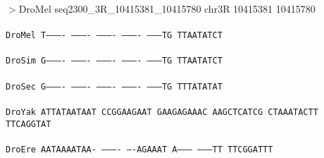\documentclass[11pt,twoside,reqno,a4paper]{article}
\begin{document}
\noindent
\newlength{\charwidth}$>$DroMel	seq2300\_3R\_10415381\_10415780	chr3R	10415381	10415780 \\
 \\
\texttt{DroMel	T----------	----------	----------	----------	--------TG	TTAATATCT\\
\hspace*{7\charwidth}\hspace*{1\charwidth}\hspace*{1\charwidth}\hspace*{1\charwidth}\hspace*{1\charwidth}\hspace*{1\charwidth}\\
DroSim	G----------	----------	----------	----------	--------TG	TTAATATCT\\
\hspace*{7\charwidth}\hspace*{1\charwidth}\hspace*{1\charwidth}\hspace*{1\charwidth}\hspace*{1\charwidth}\hspace*{1\charwidth}\\
DroSec	G----------	----------	----------	----------	--------TG	TTTATATAT\\
\hspace*{7\charwidth}\hspace*{1\charwidth}\hspace*{1\charwidth}\hspace*{1\charwidth}\hspace*{1\charwidth}\hspace*{1\charwidth}\\
DroYak	ATTATAATAAT	CCGGAAGAAT	GAAGAGAAAC	AAGCTCATCG	CTAAATACTT	TTCAGGTAT\\
\hspace*{7\charwidth}\hspace*{1\charwidth}\hspace*{1\charwidth}\hspace*{1\charwidth}\hspace*{1\charwidth}\hspace*{1\charwidth}\\
DroEre	AATAAAATAA-	----------	----AGAAAT	A---------	--------TT	TTCGGATTT\\
\hspace*{7\charwidth}\hspace*{1\charwidth}\hspace*{1\charwidth}\hspace*{1\charwidth}\hspace*{1\charwidth}\hspace*{1\charwidth}\\
}
\end{document}
